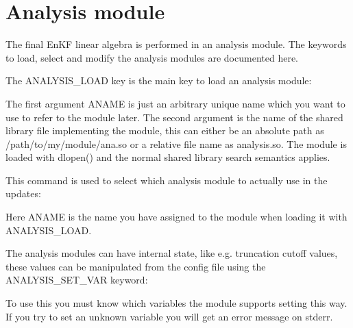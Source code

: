 \documentclass[letterpaper,10pt,english]{sphinxmanual}
\begin{document}
\section{Analysis module}
\label{\detokenize{keywords/index:analysis-module}}\label{\detokenize{keywords/index:id10}}
The final EnKF linear algebra is performed in an analysis module. The keywords
to load, select and modify the analysis modules are documented here.

\label{\detokenize{keywords/index:analysis-load}}
\begin{sphinxShadowBox}

The ANALYSIS\_LOAD key is the main key to load an analysis module:

%
\begin{sphinxVerbatim}[commandchars=\\\{\}]
   
\end{sphinxVerbatim}

The first argument ANAME is just an arbitrary unique name which you want to
use to refer to the module later. The second argument is the name of the
shared library file implementing the module, this can either be an absolute
path as /path/to/my/module/ana.so or a relative file name as analysis.so. The
module is loaded with dlopen() and the normal shared library search semantics
applies.
\end{sphinxShadowBox}
\label{\detokenize{keywords/index:analysis-select}}
\begin{sphinxShadowBox}

This command is used to select which analysis module to actually use in the
updates:

%
\begin{sphinxVerbatim}[commandchars=\\\{\}]
 
\end{sphinxVerbatim}

Here ANAME is the name you have assigned to the module when loading it with
ANALYSIS\_LOAD.
\end{sphinxShadowBox}
\label{\detokenize{keywords/index:analysis-set-var}}
\begin{sphinxShadowBox}

The analysis modules can have internal state, like e.g. truncation cutoff
values, these values can be manipulated from the config file using the
ANALYSIS\_SET\_VAR keyword:

%
\begin{sphinxVerbatim}[commandchars=\\\{\}]
      
\end{sphinxVerbatim}

To use this you must know which variables the module supports setting this
way. If you try to set an unknown variable you will get an error message on
stderr.
\end{sphinxShadowBox}
\end{document}

